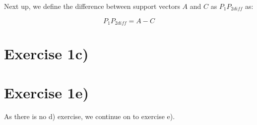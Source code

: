 \documentclass[10pt,a4paper]{article}
\begin{document}
	Next up, we define the difference between support vectors $A$ and $C$ as $P_1P_{2diff}$ as:
	
	\begin{equation}
		P_1P_{2diff} = A - C
	\end{equation}
	
	
	
	\section*{Exercise 1c)}
	
	\section*{Exercise 1e)}
	As there is no d) exercise, we continue on to exercise e).
	
\end{document}
